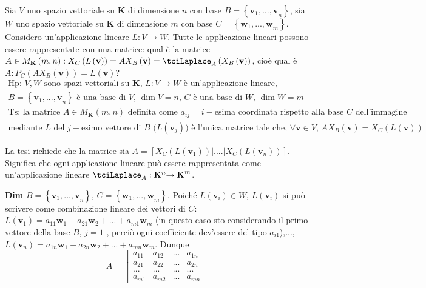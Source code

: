 \documentclass{article}
\begin{document}
Sia $V$ uno spazio vettoriale su $\mathbf{K}$ di dimensione $n$ con base $%
B=\left\{ \mathbf{v}_{1}\mathbf{,...,v}_{n}\right\} $, sia $W$ uno spazio
vettoriale su $\mathbf{K}$ di dimensione $m$ con base $C=\left\{ \mathbf{w}%
_{1}\mathbf{,...,w}_{m}\right\} $. Considero un'applicazione lineare $%
L:V\rightarrow W$. Tutte le applicazione lineari possono essere
rappresentate con una matrice: qual \`{e} la matrice $A\in M_{\mathbf{K}%
}\left( m,n\right) :X_{C}\left( L\left( \mathbf{v}\right) \right)
=AX_{B}\left( \mathbf{v}\right) =\tciLaplace _{A}\left( X_{B}\left( \mathbf{v%
}\right) \right) $, cio\`{e} qual \`{e} $A:P_{C}\left( AX_{B}\left( \mathbf{v%
}\right) \right) =L\left( \mathbf{v}\right) $?%
\begin{gather*}
\text{Hp}\text{: }V,W\text{ sono spazi vettoriali su }\mathbf{K}\text{, }%
L:V\rightarrow W\text{ \`{e} un'applicazione lineare,} \\
B=\left\{ \mathbf{v}_{1}\mathbf{,...,v}_{n}\right\} \text{ \`{e} una base di 
}V\text{, }\dim V=n\text{, }C\text{ \`{e} una base di }W\text{, }\dim W=m \\
\text{Ts}\text{:}\text{ la matrice }A\in M_{\mathbf{K}}\left( m,n\right) 
\text{ definita come }a_{ij}=i-\text{esima coordinata rispetto alla base }C%
\text{ dell'immagine } \\
\text{mediante }L\text{ del }j-\text{esimo vettore di }B\text{ (}L\left( 
\mathbf{v}_{j}\right) \text{) \`{e} l'unica matrice tale che, }\forall \text{
}\mathbf{v}\in V\text{, }AX_{B}\left( \mathbf{v}\right) =X_{C}\left( L\left( 
\mathbf{v}\right) \right)
\end{gather*}

La tesi richiede che la matrice sia $A=\left[ X_{C}\left( L\left( \mathbf{v}%
_{1}\right) \right) |....|X_{C}\left( L\left( \mathbf{v}_{n}\right) \right) %
\right] $. Significa che ogni applicazione lineare pu\`{o} essere
rappresentata come un'applicazione lineare $\tciLaplace _{A}:\mathbf{K}^{n}%
\mathbf{\rightarrow K}^{m}$.

\textbf{Dim} $B=\left\{ \mathbf{v}_{1}\mathbf{,...,v}_{n}\right\} $, $%
C=\left\{ \mathbf{w}_{1}\mathbf{,...,w}_{m}\right\} $. Poich\'{e} $L\left( 
\mathbf{v}_{i}\right) \in W$, $L\left( \mathbf{v}_{i}\right) $ si pu\`{o}
scrivere come combinazione lineare dei vettori di $C$: $L\left( \mathbf{v}%
_{1}\right) =a_{11}\mathbf{w}_{1}+a_{21}\mathbf{w}_{2}+...+a_{m1}\mathbf{w}%
_{m}$ (in questo caso sto considerando il primo vettore della base $B$, $j=1$%
, perci\`{o} ogni coefficiente dev'essere del tipo $a_{i1}$),..., $L\left( 
\mathbf{v}_{n}\right) =a_{1n}\mathbf{w}_{1}+a_{2n}\mathbf{w}_{2}+...+a_{mn}%
\mathbf{w}_{m}$. Dunque%
\begin{equation*}
A=\left[ 
\begin{array}{cccc}
a_{11} & a_{12} & ... & a_{1n} \\ 
a_{21} & a_{22} & ... & a_{2n} \\ 
... & ... & ... & ... \\ 
a_{m1} & a_{m2} & ... & a_{mn}%
\end{array}%
\right]
\end{equation*}
\end{document}
